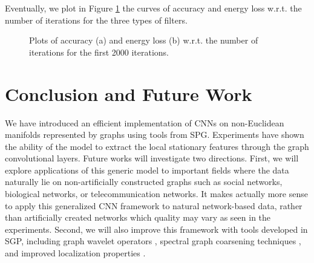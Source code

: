 \documentclass{article}
\begin{document}
\noindent
Eventually, we plot in Figure  \ref{fig1} the curves of accuracy and energy loss w.r.t. the number of iterations for the three types of filters. 


\begin{figure}[h!]
\centering
{}
\hspace{0.5cm}
\caption{Plots of accuracy (a) and energy loss (b) w.r.t. the number of iterations for the first 2000 iterations.}
\label{fig1}
\end{figure}



\section{Conclusion and Future Work}
\vspace{-0.2cm}
We have introduced an efficient implementation of CNNs on non-Euclidean manifolds represented by graphs using tools from SPG. Experiments have shown the ability of the model to extract the local stationary features through the graph convolutional layers. Future works will investigate two directions. First, we will explore applications of this generic model to important fields where the data naturally lie on non-artificially constructed graphs such as social networks, biological networks, or telecommunication networks. It makes actually more sense to apply this generalized CNN framework to natural network-based data, rather than artificially created networks which quality may vary as seen in the experiments. Second, we will also improve this framework with tools developed in SGP, including graph wavelet operators \cite{art:HammondVandergheynstGribonval11GraphWav,art:CoifmanLafon06DifMap,pro:GavishNadlerCoifman10GraphHaar,pro:ChenChengMallat14deepHaar,pro:RustamovGuibas14deepHaar}, spectral graph coarsening techniques \cite{art:ShumanFarajiVandergheynst16PyramTrans}, and improved localization properties \cite{pro:TsitsveroBarbarossa15Uncert,pro:PasdeloupAlamiGriponRabbat15Uncert,art:PerraudinRicaudShumanVandergheynst16Uncert}.












\newpage


{
{\small

%
}
}
\end{document}
